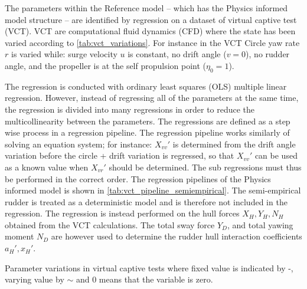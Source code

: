 The parameters within the Reference model -- which has the Physics informed model structure -- are identified by regression on a dataset of virtual captive test (VCT). VCT are computational fluid dynamics (CFD) where the state has been varied according to \autoref{tab:vct_variations}. For instance in the VCT Circle yaw rate $r$ is varied while: surge velocity $u$ is constant, no drift angle ($v=0$), no rudder angle, and the propeller is at the self propulsion point ($\eta_0=1$).

The regression is conducted with ordinary least squares (OLS) multiple linear regression. However, instead of regressing all of the parameters at the same time, the regression is divided into many regressions in order to reduce the multicollinearity between the parameters. The regressions are defined as a step wise process in a regression pipeline. 
The regression pipeline works similarly of solving an equation system; for instance: ${X_{vv}}'$ is determined from the drift angle variation before the circle + drift variation is regressed, so that ${X_{vv}}'$ can be used as a known value when ${X_{vr}}'$ should be determined. The sub regressions must thus be performed in the correct order. 
The regression pipelines of the Physics informed model is shown in \autoref{tab:vct_pipeline_semiempirical}. The semi-empirical rudder is treated as a deterministic model and is therefore not included in the regression. The regression is instead performed on the hull forces $X_H,Y_H,N_H$ obtained from the VCT calculations. The total sway force $Y_D$, and total yawing moment $N_D$ are however used to determine the rudder hull interaction coefficients ${a_H}',{x_H}'$. 
\begin{table}[h!]
    \centering
    \caption{Parameter variations in virtual captive tests where fixed value is indicated by -, varying value by $\sim$ and 0 means that the variable is zero.}
    \label{tab:vct_variations}
\end{table}

